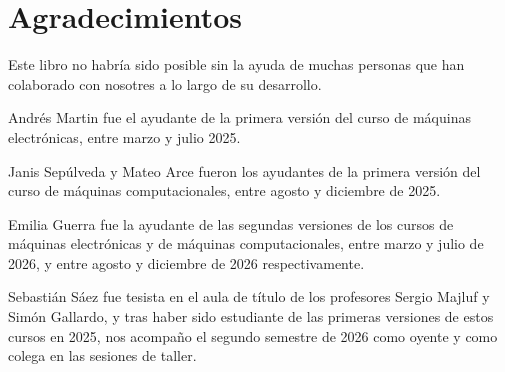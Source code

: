 \documentclass[../principal.tex]{subfiles}
\begin{document}
\chapter{Agradecimientos}

Este libro no habría sido posible sin la ayuda de muchas personas que han colaborado con nosotres a lo largo de su desarrollo.

Andrés Martin fue el ayudante de la primera versión del curso de máquinas electrónicas, entre marzo y julio 2025.

Janis Sepúlveda y Mateo Arce fueron los ayudantes de la primera versión del curso de máquinas computacionales, entre agosto y diciembre de 2025.

Emilia Guerra fue la ayudante de las segundas versiones de los cursos de máquinas electrónicas y de máquinas computacionales, entre marzo y julio de 2026, y entre agosto y diciembre de 2026 respectivamente.

Sebastián Sáez fue tesista en el aula de título de los profesores Sergio Majluf y Simón Gallardo, y tras haber sido estudiante de las primeras versiones de estos cursos en 2025, nos acompaño el segundo semestre de 2026 como oyente y como colega en las sesiones de taller.


\newpage
\end{document}
